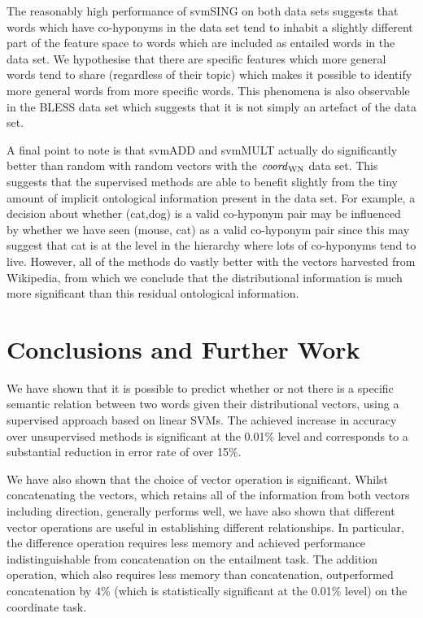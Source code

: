 \documentclass[11pt]{article}
\newcommand\coordWN{\mbox{\em coord\/}_{\mbox{\scriptsize WN}}}
\begin{document}
The reasonably high performance of svmSING on both data sets suggests that words which have co-hyponyms in the data set tend to inhabit a slightly different part of the feature space to words which are included as entailed words in the data set.  We hypothesise that there are specific features which more general words tend to share (regardless of their topic) which makes it possible to identify more general words from more specific words.  This phenomena is also observable in the BLESS data set which suggests that it is not simply an artefact of the data set.

A final point to note is that svmADD and svmMULT actually do significantly better than random with random vectors with the $\coordWN$ data set.  This suggests that the supervised methods are able to benefit slightly from the tiny amount of implicit ontological information present in the data set.  For example, a decision about whether (cat,dog) is a valid co-hyponym pair may be influenced by whether we have seen (mouse, cat) as a valid co-hyponym pair since this may suggest that cat is at the level in the hierarchy where lots of co-hyponyms tend to live.  However, all of the methods do vastly better with the vectors harvested from Wikipedia, from which we conclude that the distributional information is much more significant than this residual ontological information.

\section{Conclusions and Further Work}

We have shown that it is possible to predict whether
or not there is a specific semantic relation between two words given
their distributional vectors, using a supervised approach based on linear SVMs. The achieved  increase in accuracy over unsupervised methods is significant at the 0.01\% level and corresponds to a substantial reduction in error rate of over 15\%.

We have also shown that the choice of vector operation is significant.  Whilst concatenating the vectors, which retains all of the information from both vectors including direction, generally performs well, we have also shown that different vector operations are useful in establishing different relationships.  In particular, the difference operation requires less memory and achieved performance indistinguishable from concatenation on the entailment task.  The addition operation, which also requires less memory than concatenation, outperformed concatenation by 4\% (which is statistically significant at the 0.01\% level) on the coordinate task.
\end{document}
